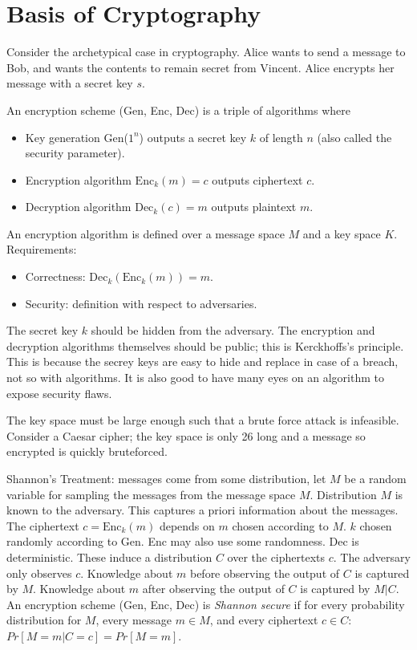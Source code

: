 \section{Basis of Cryptography}

Consider the archetypical case in 
cryptography.
Alice wants to send a message to Bob,
and wants the contents to remain 
secret from Vincent. Alice encrypts 
her message with a secret key $s$.

An encryption scheme (Gen, Enc, Dec) 
is a triple of algorithms where
\begin{itemize}
    \item Key generation Gen($1^n$)
    outputs a secret key $k$ of length 
    $n$ (also called the security parameter).
    \item Encryption algorithm 
    $\text{Enc}_k(m) = c$ outputs ciphertext 
    $c$. 
    \item Decryption algorithm $\text{Dec}_k(c) = m$
    outputs plaintext $m$.  
\end{itemize}
An encryption algorithm is defined over 
a message space $M$ and a key space $K$. 
Requirements:
\begin{itemize}
    \item Correctness: $\text{Dec}_k(\text{Enc}_k(m)) = m$.
    \item Security: definition with respect to adversaries. 
\end{itemize}

The secret key $k$ should be hidden from the 
adversary. The encryption and decryption 
algorithms themselves should be public; this 
is Kerckhoffs's principle. This is because 
the secrey keys are easy to hide and replace 
in case of a breach, not so with algorithms. 
It is also good to have many eyes on an 
algorithm to expose security flaws. 

The key space must be large enough 
such that a brute force attack is 
infeasible. Consider a Caesar cipher;
the key space is only 26 long and a
message so encrypted is quickly bruteforced. 

Shannon's Treatment: messages come 
from some distribution, let $M$ be 
a random variable for sampling the 
messages from the message space $M$. 
Distribution $M$ is known to the 
adversary. This captures a priori 
information about the messages. 
The ciphertext $c = \text{Enc}_k(m)$
depends on $m$ chosen according to $M$. 
$k$ chosen randomly according to $\text{Gen}$. 
Enc may also use some randomness. Dec is 
deterministic. These induce a distribution $C$ 
over the ciphertexts $c$. 
The adversary only observes $c$. 
Knowledge about $m$ before observing 
the output of $C$ is captured by $M$. 
Knowledge about $m$ after observing the 
output of $C$ is captured by $M|C$. 
An encryption scheme (Gen, Enc, Dec) is 
\emph{Shannon secure} if for every probability 
distribution for $M$, every message $m \in M$,
and every ciphertext $c \in C$: 
$Pr[M=m|C=c] = Pr[M=m]$. 

